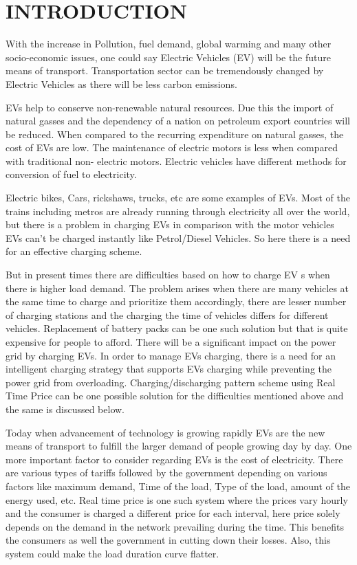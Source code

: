 	\chapter{INTRODUCTION}
	\label{chap:intro}
	
	
	With the increase in Pollution, fuel demand, global warming and many other socio-economic issues, one could say Electric Vehicles (EV) will be the future means of transport. Transportation sector can be tremendously changed by Electric Vehicles as there will be less carbon emissions.
	
	EVs help to conserve non-renewable natural resources. Due
	this the import of natural gasses and the dependency of a nation on petroleum export countries
	will be reduced. When compared to the recurring expenditure on natural gasses, the cost of
	EVs are low. The maintenance of electric motors is less when compared with traditional non-
	electric motors. Electric vehicles have different methods for conversion of fuel to electricity.
	
	
	
	\par Electric bikes, Cars, rickshaws, trucks, etc are some examples of EVs. Most of the trains including metros are already running through electricity all over the world, but there is a problem in charging EVs in comparison with the motor vehicles EVs can't be charged instantly like Petrol/Diesel Vehicles. 
	So here there is a need for an effective charging scheme.
	
	\par But in present times there are difficulties based on how to charge EV s when there is higher
	load demand. The problem arises when there are many vehicles at the same time to charge
	and prioritize them accordingly, there are lesser number of charging stations and the charging
	the time of vehicles differs for different vehicles. Replacement of battery packs can be one such
	solution but that is quite expensive for people to afford. There will be a significant impact on the power grid by charging EVs. In order to manage EVs charging, there is a need for an intelligent
	charging strategy that supports EVs charging while preventing the power grid from
	overloading. Charging/discharging pattern scheme using Real Time Price can be one possible
	solution for the difficulties mentioned above and the same is discussed below.
	
	\par Today when advancement of technology is growing rapidly EVs are the new means of transport to fulfill the larger demand of people growing day by day. One more important factor to consider regarding EVs is the cost of electricity. There are various types of tariffs followed by the government depending on various factors like maximum demand, Time of the load, Type of the load, amount of the energy used, etc. Real time price is one such system where the prices vary hourly and the consumer is charged a different price for each interval, here price solely depends on the demand in the network prevailing during the time. This benefits the consumers as well the government in cutting down their losses. Also, this system could make the load duration curve flatter.


